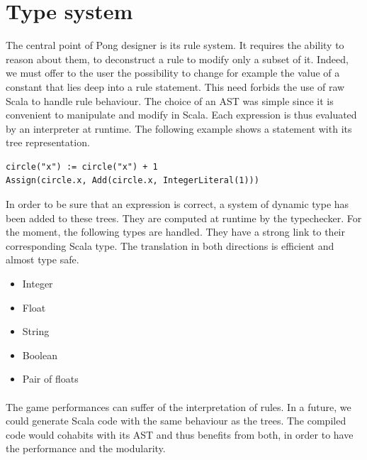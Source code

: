 \documentclass[11pt,a4paper]{article}
\begin{document}
\section{Type system}
The central point of Pong designer is its rule system. It requires the ability to reason about them, to deconstruct a rule to modify only a subset of it. Indeed, we must offer to the user the possibility to change for example the value of a constant that lies deep into a rule statement. This need forbids the use of raw Scala to handle rule behaviour. The choice of an AST was simple since it is convenient to manipulate and modify in Scala. Each expression is thus evaluated by an interpreter at runtime. The following example shows a statement with its tree representation.
\begin{lstlisting}
circle("x") := circle("x") + 1
Assign(circle.x, Add(circle.x, IntegerLiteral(1)))
\end{lstlisting}

In order to be sure that an expression is correct, a system of dynamic type has been added to these trees. They are computed at runtime by the typechecker. For the moment, the following types are handled. They have a strong link to their corresponding Scala type. The translation in both directions is efficient and almost type safe.
\begin{itemize}[noitemsep,topsep=2pt,parsep=1pt,partopsep=1pt]
\item Integer
\item Float
\item String
\item Boolean
\item Pair of floats
\end{itemize}

\paragraph*{}
The game performances can suffer of the interpretation of rules. In a future, we could generate Scala code with the same behaviour as the trees. The compiled code would cohabits with its AST and thus benefits from both, in order to have the performance and the modularity.
\end{document}
